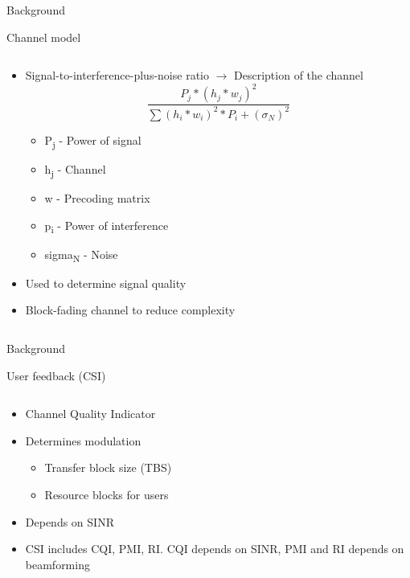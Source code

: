 \documentclass[xcolor={cmyk}]{beamer}
\begin{document}
 \begin{frame}{Background}
 	\begin{block}{Channel model}
		\begin{columns}
			\begin{column}{.9\textwidth}
				\begin{itemize}
					\item Signal-to-interference-plus-noise ratio $\rightarrow$ Description of the channel
					\begin{equation*}
\frac{P_j*(h_j*w_j)^{2}}{\sum (h_i*w_i)^{2}*P_i+(\sigma_N)^{2}}
					\end{equation*}
					\begin{itemize}
						\item P\textsubscript{j} - Power of signal
						\item h\textsubscript{j} - Channel
						\item w - Precoding matrix
						\item p\textsubscript{i} - Power of interference
						\item sigma\textsubscript{N} - Noise
					\end{itemize}
					\item Used to determine signal quality
					\item Block-fading channel to reduce complexity
				\end{itemize}
			\end{column}
		\end{columns}
	 \end{block}
 \end{frame}

 \begin{frame}{Background}
 	\begin{block}{User feedback (CSI)}
		\begin{columns}
			\begin{column}{.9\textwidth}
				\begin{itemize}
					\item Channel Quality Indicator
					\item Determines modulation
					\begin{itemize}
						\item Transfer block size (TBS)
						\item Resource blocks for users
					\end{itemize}
					\item Depends on SINR
					\item CSI includes CQI, PMI, RI. CQI depends on SINR, PMI and RI depends on beamforming
				\end{itemize}
			\end{column}
		\end{columns}
	 \end{block}
 \end{frame}
\end{document}
